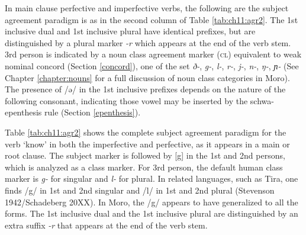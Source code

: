In main clause perfective and imperfective verbs, the following are the subject agreement paradigm is as in the second column of Table \ref{tab:ch11:agr2}. The 1st inclusive dual and 1st inclusive plural have identical prefixes, but are distinguished by a plural marker \textit{-r} which appears at the end of the verb stem. 3rd person is indicated by a noun class agreement marker (\textsc{cl}) equivalent to weak nominal concord (Section \ref{concord}), one of the set \textit{ð-}, \textit{g-}, \textit{l-}, \textit{r-}, \textit{j-}, \textit{n-}, \textit{ŋ-}, \textit{ɲ-} (See Chapter \ref{chapter:nouns} for a full discussion of noun class categories in Moro). The presence of /ə/ in the 1st inclusive prefixes depends on the nature of the following consonant, indicating those vowel may be inserted by the schwa-epenthesis rule (Section \ref{epenthesis}). 


Table \ref{tab:ch11:agr2} shows the complete subject agreement paradigm for the verb ‘know’ in both the imperfective and perfective, as it appears in a main or root clause. The subject marker is followed by [g] in the 1st and 2nd persons, which is analyzed as a class marker. For 3rd person, the default human class marker is \textit{g-} for singular and \textit{l-} for plural. In related languages, such as Tira, one finds /g/ in 1st and 2nd singular and /l/ in 1st and 2nd plural (Stevenson 1942/Schadeberg 20XX). In Moro, the /g/ appears to have generalized to all the forms. The 1st inclusive dual and the 1st inclusive plural are distinguished by an extra suffix \textit{-r} that appears at the end of the verb stem.  %

